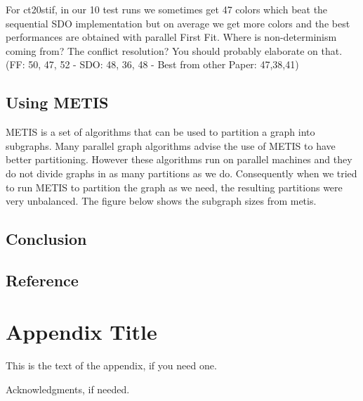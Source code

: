 \documentclass[preprint]{sigplanconf}
\begin{document}
For ct20stif, in our 10 test runs we sometimes get 47 colors which beat the sequential SDO implementation but on average we get more colors and the best performances are obtained with parallel First Fit. Where is non-determinism coming from?  The conflict resolution?  You should probably elaborate on that.
(FF: 50, 47, 52 - SDO: 48, 36, 48 - Best from other Paper: 47,38,41)\

\subsection{Using METIS}
METIS is a set of algorithms that can be used to partition a graph into subgraphs. Many parallel graph algorithms advise the use of METIS to have better partitioning. However these algorithms run on parallel machines and they do not divide graphs in as many partitions as we do. Consequently when we tried to run METIS to partition the graph as we need, the resulting partitions were very unbalanced. The figure below shows the subgraph sizes from metis.

\subsection{Conclusion}

\subsection{Reference}



\appendix
\section{Appendix Title}

This is the text of the appendix, if you need one.

\acks

Acknowledgments, if needed.











\end{document}
